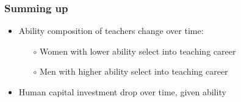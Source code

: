 \documentclass[11pt]{beamer}
\begin{document}

\begin{frame}
	\frametitle{Summing up}
	
	\begin{itemize}
		\item Ability composition of teachers change over time:
		\begin{itemize}
			\item[$\circ$] Women with lower ability select into teaching career %
			\item[$\circ$] Men with higher ability select into teaching career %
		\end{itemize}
		\item Human capital investment drop over time, given ability %
	\end{itemize}
\end{frame}
\end{document}
